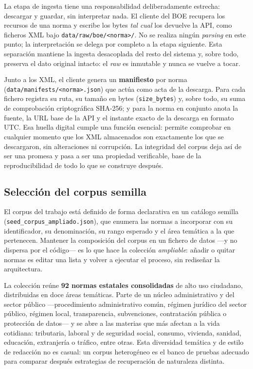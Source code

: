 La etapa de ingesta tiene una responsabilidad deliberadamente estrecha: descargar y guardar, sin interpretar nada. El cliente del BOE recupera los recursos de una norma y escribe los bytes \emph{tal cual} los devuelve la API, como ficheros XML bajo \texttt{data/raw/boe/<norma>/}. No se realiza ningún \emph{parsing} en este punto; la interpretación se delega por completo a la etapa siguiente. Esta separación mantiene la ingesta desacoplada del resto del sistema y, sobre todo, preserva el dato original intacto: el \emph{raw} es inmutable y nunca se vuelve a tocar.

Junto a los XML, el cliente genera un \textbf{manifiesto} por norma (\texttt{data/manifests/<norma>.json}) que actúa como acta de la descarga. Para cada fichero registra su ruta, su tamaño en bytes (\texttt{size\_bytes}) y, sobre todo, su suma de comprobación criptográfica SHA-256; y para la norma en conjunto anota la fuente, la URL base de la API y el instante exacto de la descarga en formato UTC. Esa huella digital cumple una función esencial: permite comprobar en cualquier momento que los XML almacenados son exactamente los que se descargaron, sin alteraciones ni corrupción. La integridad del corpus deja así de ser una promesa y pasa a ser una propiedad verificable, base de la reproducibilidad de todo lo que se construye después.

\subsection{Selección del corpus semilla}
\label{subsec:seleccion-corpus}

El corpus del trabajo está definido de forma declarativa en un catálogo semilla (\texttt{seed\_corpus\_ampliado.json}), que enumera las normas a incorporar con su identificador, su denominación, su rango esperado y el área temática a la que pertenecen. Mantener la composición del corpus en un fichero de datos —y no dispersa por el código— es lo que hace la colección \emph{ampliable}: añadir o quitar normas es editar una lista y volver a ejecutar el proceso, sin rediseñar la arquitectura.

La colección reúne \textbf{92 normas estatales consolidadas} de alto uso ciudadano, distribuidas en doce áreas temáticas. Parte de un núcleo administrativo y del sector público —procedimiento administrativo común, régimen jurídico del sector público, régimen local, transparencia, subvenciones, contratación pública o protección de datos— y se abre a las materias que más afectan a la vida cotidiana: tributaria, laboral y de seguridad social, consumo, vivienda, sanidad, educación, extranjería o tráfico, entre otras. Esta diversidad temática y de estilo de redacción no es casual: un corpus heterogéneo es el banco de pruebas adecuado para comparar después estrategias de recuperación de naturaleza distinta.

